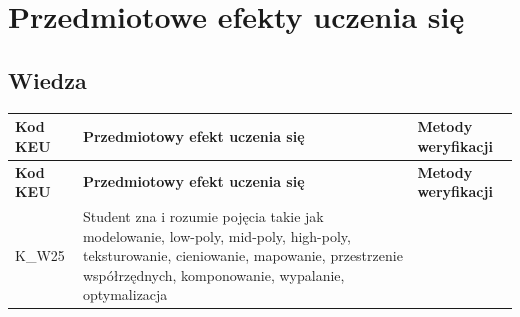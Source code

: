 \documentclass[12pt, a4paper]{article}
\newcommand{\thdrule}{\noalign{\global\setlength{\extrarowheight}{0pt}}}
\newcommand{\thdend}{\noalign{\global\setlength{\extrarowheight}{3pt}}}
\begin{document}
\section{Przedmiotowe efekty uczenia się}

\subsection*{Wiedza}
{\scriptsize
\begin{longtable}{m{1.6cm}m{9.0cm}m{4.2cm}}
\thdrule\toprule
\rowcolor{pjatkRed} {\color{white}\footnotesize\textbf{\vphantom{Ag}Kod KEU}} & {\color{white}\footnotesize\textbf{\vphantom{Ag}Przedmiotowy efekt uczenia się}} & {\color{white}\footnotesize\textbf{\vphantom{Ag}Metody weryfikacji}} \\
\midrule\thdend
\endfirsthead
\thdrule\toprule
\rowcolor{pjatkRed} {\color{white}\footnotesize\textbf{\vphantom{Ag}Kod KEU}} & {\color{white}\footnotesize\textbf{\vphantom{Ag}Przedmiotowy efekt uczenia się}} & {\color{white}\footnotesize\textbf{\vphantom{Ag}Metody weryfikacji}} \\
\midrule\thdend
\endhead
  \rowcolor{tableRowLight} K\_W25 & Student zna i rozumie pojęcia takie jak modelowanie, low-poly, mid-poly, high-poly, teksturowanie, cieniowanie, mapowanie, przestrzenie współrzędnych, komponowanie, wypalanie, optymalizacja &  \\
\bottomrule
\end{longtable}}
\end{document}
